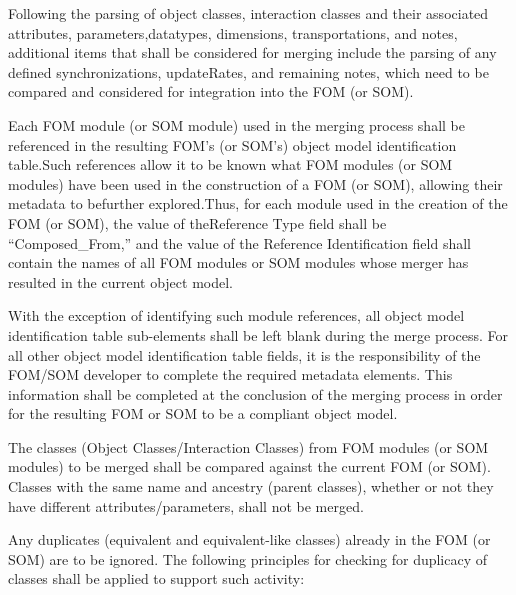 Following the parsing of object classes, interaction classes and their associated attributes, parameters,\linebreak datatypes, dimensions, transportations, and notes, additional items that shall be considered for merging include the parsing of any defined synchronizations, updateRates, and remaining notes, which need to be compared and considered for integration into the FOM (or SOM).

\vspace{2pt}
Each FOM module (or SOM module) used in the merging process shall be referenced in the resulting FOM's (or SOM's) object model identification table.Such references allow it to be known what FOM modules (or SOM modules) have been used in the construction of a FOM (or SOM), allowing their metadata to be\linebreak further explored.Thus, for each module used in the creation of the FOM (or SOM), the value of the\linebreak Reference Type field shall be ``Composed\_From,'' and the value of the Reference Identification field shall contain the names of all FOM modules or SOM modules whose merger has resulted in the current object model.

With the exception of identifying such module references, all object model identification table sub-elements shall be left blank during the merge process. For all other object model identification table fields, it is the responsibility of the FOM/SOM developer to complete the required metadata elements. This information shall be completed at the conclusion of the merging process in order for the resulting FOM or SOM to be a compliant object model.

\vspace{1.7pt}
The classes (Object Classes/Interaction Classes) from FOM modules (or SOM modules) to be merged shall be compared against the current FOM (or SOM). Classes with the same name and ancestry (parent classes), whether or not they have different attributes/parameters, shall not be merged.
\endgroup

\newpage
\begingroup
\annexcbodyfont
\setlength{\parskip}{12pt plus 1pt minus 1pt}
Any duplicates (equivalent and equivalent-like classes) already in the FOM (or SOM) are to be ignored. The following principles for checking for duplicacy of classes shall be applied to support such activity:

